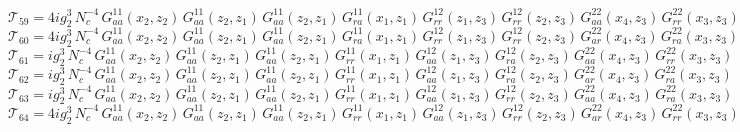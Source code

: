 \documentclass{article}
\begin{document}
\begin{equation*}
\mathcal{T}_{59} = 4 i g_{2}^{3}\,N_c^{-4}\,G^{11}_{aa}\left(x_2,z_{2}\right) \, G^{11}_{aa}\left(z_{2},z_{1}\right) \, G^{11}_{aa}\left(z_{2},z_{1}\right) \, G^{11}_{ra}\left(x_1,z_{1}\right) \, G^{12}_{rr}\left(z_{1},z_{3}\right) \, G^{12}_{rr}\left(z_{2},z_{3}\right) \, G^{22}_{aa}\left(x_4,z_{3}\right) \, G^{22}_{rr}\left(x_3,z_{3}\right)
\end{equation*}
\begin{equation*}
\mathcal{T}_{60} = 4 i g_{2}^{3}\,N_c^{-4}\,G^{11}_{aa}\left(x_2,z_{2}\right) \, G^{11}_{aa}\left(z_{2},z_{1}\right) \, G^{11}_{aa}\left(z_{2},z_{1}\right) \, G^{11}_{ra}\left(x_1,z_{1}\right) \, G^{12}_{rr}\left(z_{1},z_{3}\right) \, G^{12}_{rr}\left(z_{2},z_{3}\right) \, G^{22}_{ar}\left(x_4,z_{3}\right) \, G^{22}_{ra}\left(x_3,z_{3}\right)
\end{equation*}
\begin{equation*}
\mathcal{T}_{61} = i g_{2}^{3}\,N_c^{-4}\,G^{11}_{aa}\left(x_2,z_{2}\right) \, G^{11}_{aa}\left(z_{2},z_{1}\right) \, G^{11}_{aa}\left(z_{2},z_{1}\right) \, G^{11}_{rr}\left(x_1,z_{1}\right) \, G^{12}_{aa}\left(z_{1},z_{3}\right) \, G^{12}_{ra}\left(z_{2},z_{3}\right) \, G^{22}_{aa}\left(x_4,z_{3}\right) \, G^{22}_{rr}\left(x_3,z_{3}\right)
\end{equation*}
\begin{equation*}
\mathcal{T}_{62} = i g_{2}^{3}\,N_c^{-4}\,G^{11}_{aa}\left(x_2,z_{2}\right) \, G^{11}_{aa}\left(z_{2},z_{1}\right) \, G^{11}_{aa}\left(z_{2},z_{1}\right) \, G^{11}_{rr}\left(x_1,z_{1}\right) \, G^{12}_{aa}\left(z_{1},z_{3}\right) \, G^{12}_{ra}\left(z_{2},z_{3}\right) \, G^{22}_{ar}\left(x_4,z_{3}\right) \, G^{22}_{ra}\left(x_3,z_{3}\right)
\end{equation*}
\begin{equation*}
\mathcal{T}_{63} = i g_{2}^{3}\,N_c^{-4}\,G^{11}_{aa}\left(x_2,z_{2}\right) \, G^{11}_{aa}\left(z_{2},z_{1}\right) \, G^{11}_{aa}\left(z_{2},z_{1}\right) \, G^{11}_{rr}\left(x_1,z_{1}\right) \, G^{12}_{aa}\left(z_{1},z_{3}\right) \, G^{12}_{rr}\left(z_{2},z_{3}\right) \, G^{22}_{aa}\left(x_4,z_{3}\right) \, G^{22}_{ra}\left(x_3,z_{3}\right)
\end{equation*}
\begin{equation*}
\mathcal{T}_{64} = 4 i g_{2}^{3}\,N_c^{-4}\,G^{11}_{aa}\left(x_2,z_{2}\right) \, G^{11}_{aa}\left(z_{2},z_{1}\right) \, G^{11}_{aa}\left(z_{2},z_{1}\right) \, G^{11}_{rr}\left(x_1,z_{1}\right) \, G^{12}_{aa}\left(z_{1},z_{3}\right) \, G^{12}_{rr}\left(z_{2},z_{3}\right) \, G^{22}_{ar}\left(x_4,z_{3}\right) \, G^{22}_{rr}\left(x_3,z_{3}\right)
\end{equation*}
\end{document}
